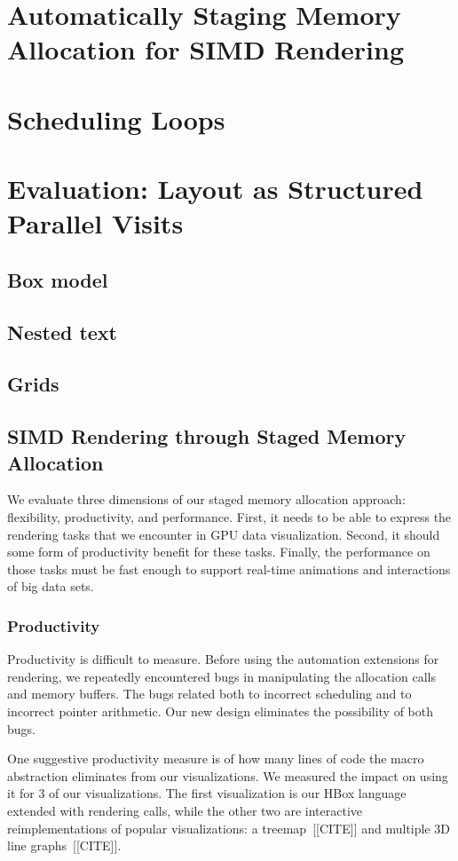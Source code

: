 \section{Automatically Staging Memory Allocation for SIMD Rendering}


\section{Scheduling Loops}


\section{Evaluation: Layout as Structured Parallel Visits}
\subsection{Box model}
\subsection{Nested text}
\subsection{Grids}


\subsection{SIMD Rendering through Staged Memory Allocation}
We evaluate three dimensions of our staged memory allocation approach: flexibility, productivity, and performance. First, it needs to be able to express the rendering tasks that we encounter in GPU data visualization. Second, it should some form of productivity benefit for these tasks. Finally, the performance on those tasks must be fast  enough to support real-time animations and interactions of big data sets.



\subsubsection{Productivity}
Productivity is difficult to measure. Before using the automation extensions for rendering, we repeatedly encountered bugs in manipulating the allocation calls and memory buffers. The bugs related both to incorrect scheduling and to incorrect pointer arithmetic. Our new design eliminates the possibility of both bugs.

One suggestive productivity measure is of how many lines of code the macro abstraction eliminates from our visualizations. We measured the impact on using it for 3 of our visualizations. The first visualization is our HBox language extended with rendering calls, while the other two are interactive reimplementations of popular visualizations: a treemap~[[CITE]] and multiple 3D line graphs~[[CITE]].


